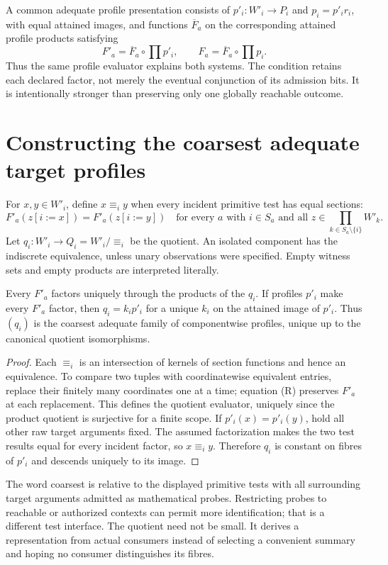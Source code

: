 \documentclass[11pt]{article}
\begin{document}
A common adequate profile presentation consists of $p'_i:W'_i\to P_i$ and $p_i=p'_ir_i$, with equal attained images, and functions $\overline F_a$ on the corresponding attained profile products satisfying
\[
 F'_a=\overline F_a\circ\prod p'_i,\qquad
 F_a=\overline F_a\circ\prod p_i. \tag{P}
\]
Thus the same profile evaluator explains both systems. The condition retains each declared factor, not merely the eventual conjunction of its admission bits. It is intentionally stronger than preserving only one globally reachable outcome.

\section{Constructing the coarsest adequate target profiles}
For $x,y\in W'_i$, define $x\equiv_i y$ when every incident primitive test has equal sections:
\[
 F'_a(z[i:=x])=F'_a(z[i:=y])
 \quad\text{for every }a\text{ with }i\in S_a
 \text{ and all }z\in\prod_{k\in S_a\setminus\{i\}}W'_k.
 \tag{R}
\]
Let $q_i:W'_i\to Q_i=W'_i/{\equiv_i}$ be the quotient. An isolated component has the indiscrete equivalence, unless unary observations were specified. Empty witness sets and empty products are interpreted literally.

\begin{proposition}\label{prop:residual}
Every $F'_a$ factors uniquely through the products of the $q_i$. If profiles $p'_i$ make every $F'_a$ factor, then $q_i=k_ip'_i$ for a unique $k_i$ on the attained image of $p'_i$. Thus $(q_i)$ is the coarsest adequate family of componentwise profiles, unique up to the canonical quotient isomorphisms.
\end{proposition}
\begin{proof}
Each $\equiv_i$ is an intersection of kernels of section functions and hence an equivalence. To compare two tuples with coordinatewise equivalent entries, replace their finitely many coordinates one at a time; equation (R) preserves $F'_a$ at each replacement. This defines the quotient evaluator, uniquely since the product quotient is surjective for a finite scope. If $p'_i(x)=p'_i(y)$, hold all other raw target arguments fixed. The assumed factorization makes the two test results equal for every incident factor, so $x\equiv_i y$. Therefore $q_i$ is constant on fibres of $p'_i$ and descends uniquely to its image.
\end{proof}

The word coarsest is relative to the displayed primitive tests with all surrounding target arguments admitted as mathematical probes. Restricting probes to reachable or authorized contexts can permit more identification; that is a different test interface. The quotient need not be small. It derives a representation from actual consumers instead of selecting a convenient summary and hoping no consumer distinguishes its fibres.
\end{document}
